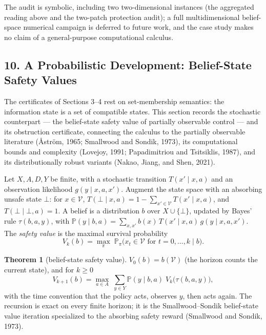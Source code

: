 \documentclass[10pt,twocolumn]{article}
\theoremstyle{definition}
\newtheorem{theorem}{Theorem}
\begin{document}
The audit is symbolic, including two two-dimensional instances
(the aggregated reading above and the two-patch protection audit); a full
multidimensional belief-space numerical campaign is deferred to future work,
and the case study makes no claim of a general-purpose computational calculus.

\subsection{10. A Probabilistic Development: Belief-State Safety Values}\label{calc-probabilistic-development}

The certificates of Sections 3--4 rest on set-membership semantics: the information state is a set of compatible states. This section records the stochastic counterpart --- the belief-state safety value of partially observable control --- and its obstruction certificate, connecting the calculus to the partially observable literature (\r{A}str\"om, 1965; Smallwood and Sondik, 1973), its computational bounds and complexity (Lovejoy, 1991; Papadimitriou and Tsitsiklis, 1987), and its distributionally robust variants (Nakao, Jiang, and Shen, 2021).

Let \(X, A, D, Y\) be finite, with a stochastic transition \(T(x' \mid x, a)\) and an observation likelihood \(g(y \mid x, a, x')\). Augment the state space with an absorbing unsafe state \(\bot\): for \(x \in \mathcal{V}\), \(T(\bot \mid x, a) = 1 - \sum_{x' \in \mathcal{V}} T(x' \mid x, a)\), and \(T(\bot \mid \bot, a) = 1\). A belief is a distribution \(b\) over \(X \cup \{\bot\}\), updated by Bayes' rule \(\tau(b, a, y)\), with \(\mathbb{P}(y \mid b, a) = \sum_{x, x'} b(x)\, T(x' \mid x, a)\, g(y \mid x, a, x')\). The \emph{safety value} is the maximal survival probability
\[
V_{k}(b) = \max_{\pi}\; \mathbb{P}_{\pi}\bigl( x_{t} \in \mathcal{V} \text{ for } t = 0, \dots, k \;\big|\; b \bigr).
\]

\begin{theorem}[belief-state safety value]\label{calc-thm:pomdp}
\(V_{0}(b) = b(\mathcal{V})\) (the horizon counts the current state), and for \(k \ge 0\)
\[
V_{k+1}(b) = \max_{a \in A}\; \sum_{y \in Y} \mathbb{P}(y \mid b, a)\; V_{k}\bigl(\tau(b, a, y)\bigr),
\]
with the time convention that the policy acts, observes \(y\), then acts again. The recursion is exact on every finite horizon; it is the Smallwood--Sondik belief-state value iteration specialized to the absorbing safety reward (Smallwood and Sondik, 1973).
\end{theorem}
\end{document}
